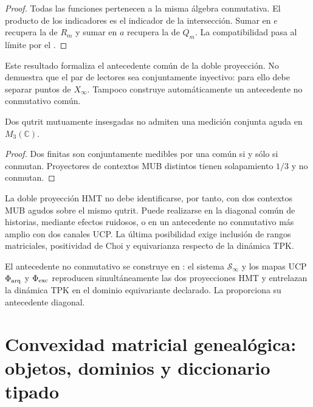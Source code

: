 \begin{proof}
Todas las funciones pertenecen a la misma álgebra conmutativa. El producto
de los indicadores es el indicador de la intersección. Sumar en $e$ recupera
la \PVM de $R_m$ y sumar en $a$ recupera la de $Q_m$. La compatibilidad pasa
al límite por el .
\end{proof}

Este resultado formaliza el antecedente común de la doble proyección. No
demuestra que el par de lectores sea conjuntamente inyectivo: para ello debe
separar puntos de $X_\infty$. Tampoco construye automáticamente un antecedente
no conmutativo común.

\begin{proposition}
Dos \PVM qutrit mutuamente insesgadas no admiten una medición conjunta aguda
en $M_3(\mathbb C)$.
\end{proposition}

\begin{proof}
Dos \PVM finitas son conjuntamente medibles por una \PVM común si y sólo si
conmutan. Proyectores de contextos MUB distintos tienen solapamiento $1/3$ y
no conmutan.
\end{proof}


La doble proyección HMT no debe identificarse, por tanto, con dos contextos
MUB agudos sobre el mismo qutrit. Puede realizarse en la diagonal común de
historias, mediante efectos ruidosos, o en un antecedente no conmutativo más
amplio con dos canales UCP. La última posibilidad exige inclusión de rangos
matriciales, positividad de Choi y equivarianza respecto de la dinámica TPK.

\begin{workbox}[fontupper=\footnotesize,fonttitle=\bfseries\footnotesize,
  boxsep=1pt,left=4pt,right=4pt,top=0pt,bottom=0pt,
  toptitle=1pt,bottomtitle=1pt]
El antecedente no conmutativo se construye en
: el sistema $\mathcal S_\infty$ y los mapas UCP
$\Phi_{\rm arq}$ y $\Phi_{\rm exc}$ reproducen simultáneamente las dos
proyecciones HMT y entrelazan la dinámica TPK en el dominio equivariante
declarado. La 
proporciona su antecedente diagonal.
\end{workbox}
\fi


\section{Convexidad matricial genealógica: objetos, dominios y diccionario
tipado}

